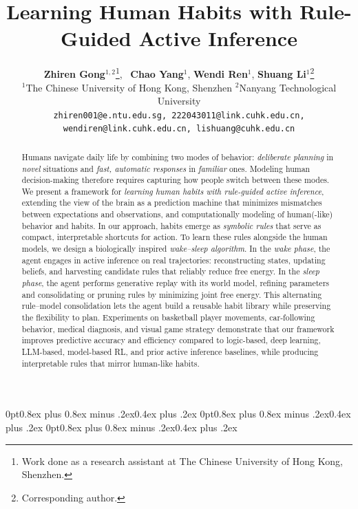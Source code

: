\documentclass{article} %
\title{Learning Human Habits with Rule-Guided Active Inference}
\author{
\textbf{Zhiren Gong}$^{1,2}$\thanks{Work done as a research assistant at The Chinese University of Hong Kong, Shenzhen.}\mbox{, }
\textbf{Chao Yang}$^1$,
\textbf{Wendi Ren}$^1$,
\textbf{Shuang Li}$^1$\thanks{Corresponding author.}
\\
$^1$The Chinese University of Hong Kong, Shenzhen \quad $^2$Nanyang Technological University
\\
\texttt{zhiren001@e.ntu.edu.sg, 222043011@link.cuhk.edu.cn,}\\
\texttt{wendiren@link.cuhk.edu.cn, lishuang@cuhk.edu.cn}
}
\newcommand{\revise}[1]{#1}
\begin{document}
\maketitle

\begin{abstract}
Humans navigate daily life by combining two modes of behavior: {\it deliberate planning} in {\it novel} situations and {\it fast, automatic responses} in {\it familiar} ones. Modeling human decision-making therefore requires capturing how people switch between these modes. We present a framework for \emph{learning human habits with rule-guided active inference}, extending the view of the brain as a prediction machine that minimizes mismatches between expectations and observations\revise{, and computationally modeling of human(-like) behavior and habits}. In our approach, habits emerge as \emph{symbolic rules} that serve as compact, interpretable shortcuts for action. To learn these rules alongside the human models, we design a biologically inspired \emph{wake--sleep algorithm}. In the \emph{wake phase}, the agent engages in active inference on real trajectories: reconstructing states, updating beliefs, and harvesting candidate rules that reliably reduce free energy. In the \emph{sleep phase}, the agent performs generative replay with its world model, refining parameters and consolidating or pruning rules by minimizing joint free energy. This alternating rule–model consolidation lets the agent build a reusable habit library while preserving the flexibility to plan. Experiments on basketball player movements, car-following behavior, medical diagnosis, and visual game strategy demonstrate that our framework improves predictive accuracy and efficiency compared to \revise{logic-based, deep learning, LLM-based, model-based RL, and prior active inference baselines}, while producing interpretable rules that mirror human-like habits.
\end{abstract}


\titlespacing*{\section}
{0pt}{0.8ex plus 0.8ex minus .2ex}{0.4ex plus .2ex}
\titlespacing*{\subsection}
{0pt}{0.8ex plus 0.8ex minus .2ex}{0.4ex plus .2ex}
\titlespacing*{\subsubsection}
{0pt}{0.8ex plus 0.8ex minus .2ex}{0.4ex plus .2ex}
\end{document}
